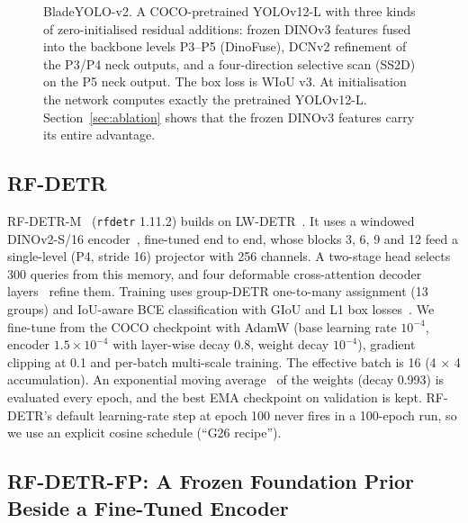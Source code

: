 \begin{figure}[!t]
\centering
\resizebox{0.92\textwidth}{!}{}
\caption{BladeYOLO-v2. A COCO-pretrained YOLOv12-L with three kinds of zero-initialised residual additions: frozen DINOv3 features fused into the backbone levels P3--P5 (DinoFuse), DCNv2 refinement of the P3/P4 neck outputs, and a four-direction selective scan (SS2D) on the P5 neck output. The box loss is WIoU v3. At initialisation the network computes exactly the pretrained YOLOv12-L. Section~\ref{sec:ablation} shows that the frozen DINOv3 features carry its entire advantage.}
\label{fig:arch-byv2}
\end{figure}

\subsection{RF-DETR}
RF-DETR-M~\cite{rfdetr} (\texttt{rfdetr} 1.11.2) builds on LW-DETR~\cite{lwdetr}. It uses a windowed DINOv2-S/16 encoder~\cite{dinov2}, fine-tuned end to end, whose blocks 3, 6, 9 and 12 feed a single-level (P4, stride 16) projector with 256 channels. A two-stage head selects 300 queries from this memory, and four deformable cross-attention decoder layers~\cite{deformabledetr} refine them. Training uses group-DETR one-to-many assignment (13 groups) and IoU-aware BCE classification with GIoU and L1 box losses~\cite{giou}. We fine-tune from the COCO checkpoint with AdamW (base learning rate $10^{-4}$, encoder $1.5\times10^{-4}$ with layer-wise decay 0.8, weight decay $10^{-4}$), gradient clipping at 0.1 and per-batch multi-scale training. The effective batch is 16 (4 $\times$ 4 accumulation). An exponential moving average~\cite{polyak} of the weights (decay 0.993) is evaluated every epoch, and the best EMA checkpoint on validation is kept. RF-DETR's default learning-rate step at epoch 100 never fires in a 100-epoch run, so we use an explicit cosine schedule (``G26 recipe'').

\subsection{RF-DETR-FP: A Frozen Foundation Prior Beside a Fine-Tuned Encoder}
\label{sec:fp}

